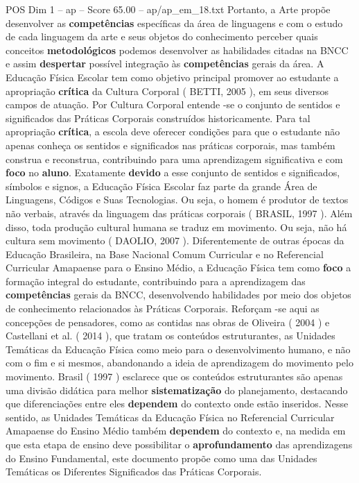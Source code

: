 \begin{textsample}{POS Dim 1 – ap – Score 65.00 – ap/ap\_em\_18.txt}
Portanto, a Arte propõe desenvolver as \textbf{competências} específicas da área de linguagens e com o estudo de cada linguagem da arte e seus objetos do conhecimento perceber quais conceitos \textbf{metodológicos} podemos desenvolver as habilidades citadas na BNCC e assim \textbf{despertar} possível integração às \textbf{competências} gerais da área.
A Educação Física Escolar tem como objetivo principal promover ao estudante a apropriação \textbf{crítica} da Cultura Corporal ( BETTI, 2005 ), em seus diversos campos de atuação.
Por Cultura Corporal entende -se o conjunto de sentidos e significados das Práticas Corporais construídos historicamente.
Para tal apropriação \textbf{crítica}, a escola deve oferecer condições para que o estudante não apenas conheça os sentidos e significados nas práticas corporais, mas também construa e reconstrua, contribuindo para uma aprendizagem significativa e com \textbf{foco} no \textbf{aluno}.
Exatamente \textbf{devido} a esse conjunto de sentidos e significados, símbolos e signos, a Educação Física Escolar faz parte da grande Área de Linguagens, Códigos e Suas Tecnologias.
Ou seja, o homem é produtor de textos não verbais, através da linguagem das práticas corporais ( BRASIL, 1997 ).
Além disso, toda produção cultural humana se traduz em movimento.
Ou seja, não há cultura sem movimento ( DAOLIO, 2007 ).
Diferentemente de outras épocas da Educação Brasileira, na Base Nacional Comum Curricular e no Referencial Curricular Amapaense para o Ensino Médio, a Educação Física tem como \textbf{foco} a formação integral do estudante, contribuindo para a aprendizagem das \textbf{competências} gerais da BNCC, desenvolvendo habilidades por meio dos objetos de conhecimento relacionados às Práticas Corporais.
Reforçam -se aqui as concepções de pensadores, como as contidas nas obras de Oliveira ( 2004 ) e Castellani et al. ( 2014 ), que tratam os conteúdos estruturantes, as Unidades Temáticas da Educação Física como meio para o desenvolvimento humano, e não com o fim e si mesmos, abandonando a ideia de aprendizagem do movimento pelo movimento.
Brasil ( 1997 ) esclarece que os conteúdos estruturantes são apenas uma divisão didática para melhor \textbf{sistematização} do planejamento, destacando que diferenciações entre eles \textbf{dependem} do contexto onde estão inseridos.
Nesse sentido, as Unidades Temáticas da Educação Física no Referencial Curricular Amapaense do Ensino Médio também \textbf{dependem} do contexto e, na medida em que esta etapa de ensino deve possibilitar o \textbf{aprofundamento} das aprendizagens do Ensino Fundamental, este documento propõe como uma das Unidades Temáticas os Diferentes Significados das Práticas Corporais.

\end{textsample}
